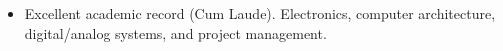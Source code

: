 \documentclass[10pt,a4paper,ragged2e,withhyper]{altacv}
\begin{document}
\smallskip %
{}
\begin{itemize}
\item Excellent academic record (Cum Laude). Electronics, computer architecture, digital/analog systems, and project management.
\end{itemize}


%
%
%
%
%
%

%
%
%
%
%
%

\end{document}
